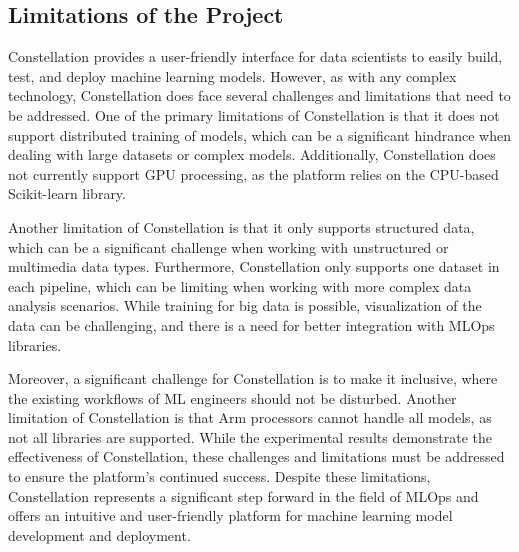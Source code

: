 \documentclass[12pt,a4paper]{report}     %
\begin{document}
\begin{normalsize}
{{{{{\section{Limitations of the Project}
Constellation provides a user-friendly interface for data scientists to easily build, test, and deploy machine learning models. However, as with any complex technology, Constellation does face several challenges and limitations that need to be addressed. One of the primary limitations of Constellation is that it does not support distributed training of models, which can be a significant hindrance when dealing with large datasets or complex models. Additionally, Constellation does not currently support GPU processing, as the platform relies on the CPU-based Scikit-learn library.
\par
Another limitation of Constellation is that it only supports structured data, which can be a significant challenge when working with unstructured or multimedia data types. Furthermore, Constellation only supports one dataset in each pipeline, which can be limiting when working with more complex data analysis scenarios. While training for big data is possible, visualization of the data can be challenging, and there is a need for better integration with MLOps libraries.
\par
Moreover, a significant challenge for Constellation is to make it inclusive, where the existing workflows of ML engineers should not be disturbed. Another limitation of Constellation is that Arm processors cannot handle all models, as not all libraries are supported. While the experimental results demonstrate the effectiveness of Constellation, these challenges and limitations must be addressed to ensure the platform's continued success. Despite these limitations, Constellation represents a significant step forward in the field of MLOps and offers an intuitive and user-friendly platform for machine learning model development and deployment.
}}}}}
\end{normalsize}
\end{document}

